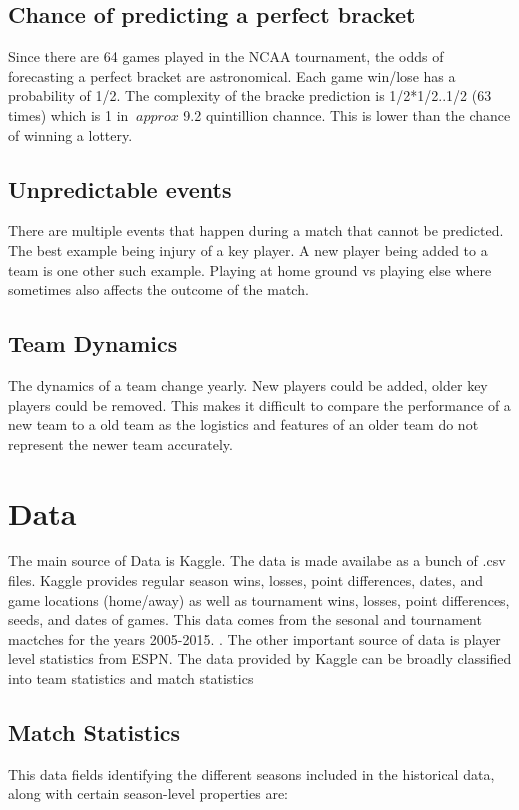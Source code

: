 \documentclass{article}
\begin{document}
\begin{multicols}{2}
	\subsection{Chance of predicting a perfect bracket}
	Since there are 64 games played in the NCAA tournament,
the odds of forecasting a perfect bracket are astronomical. Each game win/lose has a probability of 1/2. The complexity of the bracke prediction is 1/2*1/2..1/2 (63 times) which is 1 in $~approx$ 9.2 quintillion channce. This is lower than the chance of winning a lottery.

	\subsection{Unpredictable events}
	There are multiple events that happen during a match that cannot be predicted. The best example being injury of a key player. A new player being added to a team is one other such example. Playing at home ground vs playing else where sometimes also affects the outcome of the match.
	
	\subsection{Team Dynamics}
	The dynamics of a team change yearly. New players could be added, older key players could be removed. This makes it difficult to compare the performance of a new team to a old team as the logistics and features of an older team do not represent the newer team accurately. 
	
	\section{Data}
	The main source of Data is Kaggle. The data is made availabe as a bunch of .csv files. Kaggle provides regular season wins, losses, point differences, dates, and game locations (home/away) as well as tournament wins, losses, point differences, seeds, and dates of games. This data comes from the sesonal and tournament mactches for the years 2005-2015. \cite{1}. The other important source of data is player level statistics from ESPN.
	\linebreak 
	The data provided by Kaggle can be broadly classified into team statistics and match statistics \cite{1}
	\subsection{Match Statistics}
	This data fields identifying the different seasons included in the historical data, along with certain season-level properties are:


\end{multicols}
\end{document}

